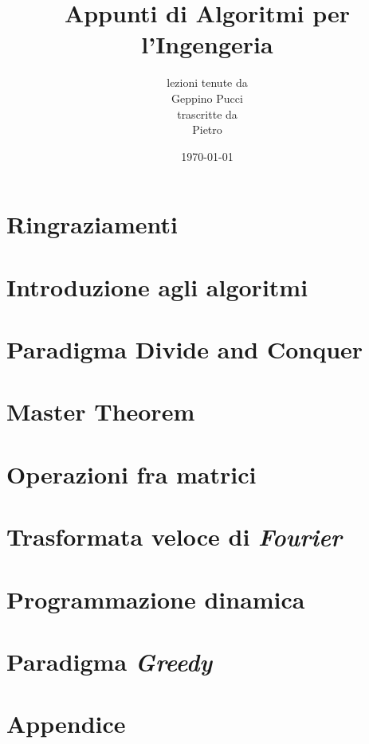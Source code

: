 \documentclass[a4paper,oneside]{book}
\title{Appunti di Algoritmi per l'Ingengeria}
\author{lezioni tenute da\\ Geppino Pucci \\ trascritte da \\ Pietro}
\date{\today}
\theoremstyle{definition}
\theoremstyle{theorem}
\theoremstyle{theorem}
\begin{document}
\pagestyle{plain}

% 
\maketitle

\cleardoublepage

\frontmatter %

\chapter*{Ringraziamenti}


\tableofcontents

\mainmatter

\pagestyle{fancy}

\chapter{Introduzione agli algoritmi}


\chapter{Paradigma Divide and Conquer}


\chapter{Master Theorem}


\chapter{Operazioni fra matrici}


\chapter{Trasformata veloce di \textit{Fourier}}


\chapter{Programmazione dinamica}


\chapter{Paradigma \emph{Greedy}}


\cleardoublepage


\cleardoublepage

\appendix

\chapter{Appendice}

\end{document}
